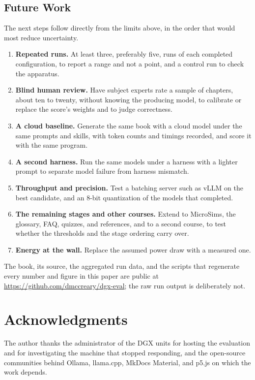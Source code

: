 \documentclass[11pt]{article}
\begin{document}
\subsection{Future Work}

The next steps follow directly from the limits above, in the order that would most reduce uncertainty.

\begin{enumerate}
\item \textbf{Repeated runs.} At least three, preferably five, runs of each completed configuration, to report a range and not a point, and a control run to check the apparatus.
\item \textbf{Blind human review.} Have subject experts rate a sample of chapters, about ten to twenty, without knowing the producing model, to calibrate or replace the score's weights and to judge correctness.
\item \textbf{A cloud baseline.} Generate the same book with a cloud model under the same prompts and skills, with token counts and timings recorded, and score it with the same program.
\item \textbf{A second harness.} Run the same models under a harness with a lighter prompt to separate model failure from harness mismatch.
\item \textbf{Throughput and precision.} Test a batching server such as vLLM on the best candidate, and an 8-bit quantization of the models that completed.
\item \textbf{The remaining stages and other courses.} Extend to MicroSims, the glossary, FAQ, quizzes, and references, and to a second course, to test whether the thresholds and the stage ordering carry over.
\item \textbf{Energy at the wall.} Replace the assumed power draw with a measured one.
\end{enumerate}

\noindent The book, its source, the aggregated run data, and the scripts that regenerate every number and figure in this paper are public at \url{https://github.com/dmccreary/dgx-eval}; the raw run output is deliberately not.


\section*{Acknowledgments}
The author thanks the administrator of the DGX units for hosting the evaluation and for investigating the machine that stopped responding, and the open-source communities behind Ollama, llama.cpp, MkDocs Material, and p5.js on which the work depends.
\end{document}
